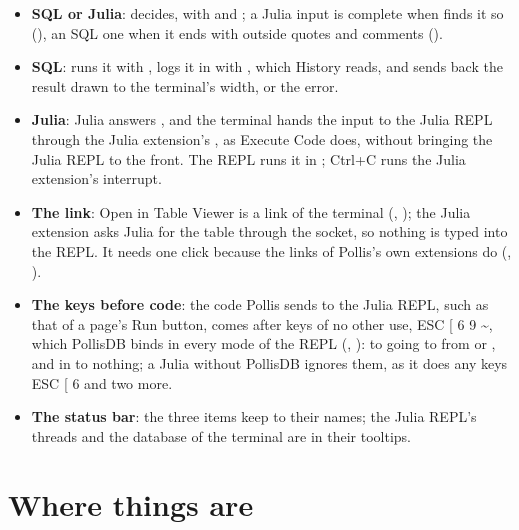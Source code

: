 \begin{itemize}
  \item \textbf{SQL or Julia}:  decides, with  and ; a Julia
    input is complete when  finds it so (), an SQL one when it ends
    with \file{;} outside quotes and comments ().
  \item \textbf{SQL}:  runs it with , logs it in
     with , which History reads, and sends back the
    result drawn to the terminal's width, or the error.
  \item \textbf{Julia}: Julia answers , and the terminal hands the input to the Julia REPL through the
    Julia extension's , as Execute Code does, without bringing the Julia REPL to the front. The
    REPL runs it in ; Ctrl+C runs the Julia extension's interrupt.
  \item \textbf{The link}: Open in Table Viewer is a link of the terminal (, );
    the Julia extension asks Julia for the table through the socket, so nothing is typed into the REPL. It needs one
    click because the links of Pollis's own extensions do (, ).
  \item \textbf{The keys before code}: the code Pollis sends to the Julia REPL, such as that of a page's Run button,
    comes after keys of no other use, ESC [ 6 9 \textasciitilde, which PollisDB binds in every mode of the REPL
    (, ): to going to  from  or , and in
     to nothing; a Julia without PollisDB ignores them, as it does any keys ESC [ 6 and two more.
  \item \textbf{The status bar}: the three items keep to their names; the Julia REPL's threads and the database of the
     terminal are in their tooltips.
\end{itemize}

\section{Where things are}

